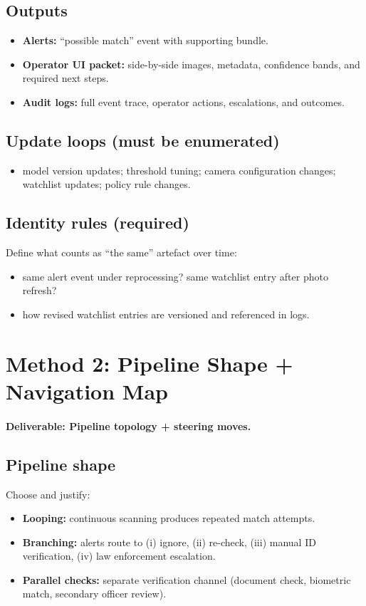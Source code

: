 \subsection*{Outputs}
\begin{itemize}
  \item \textbf{Alerts:} “possible match” event with supporting bundle.
  \item \textbf{Operator UI packet:} side-by-side images, metadata, confidence bands, and required next steps.
  \item \textbf{Audit logs:} full event trace, operator actions, escalations, and outcomes.
\end{itemize}

\subsection*{Update loops (must be enumerated)}
\begin{itemize}
  \item model version updates; threshold tuning; camera configuration changes; watchlist updates; policy rule changes.
\end{itemize}

\subsection*{Identity rules (required)}
Define what counts as “the same” artefact over time:
\begin{itemize}
  \item same alert event under reprocessing? same watchlist entry after photo refresh?
  \item how revised watchlist entries are versioned and referenced in logs.
\end{itemize}

\section{Method 2: Pipeline Shape + Navigation Map}
\label{sec:airport-m2}

\paragraph{Deliverable: Pipeline topology + steering moves.}

\subsection*{Pipeline shape}
Choose and justify:
\begin{itemize}
  \item \textbf{Looping:} continuous scanning produces repeated match attempts.
  \item \textbf{Branching:} alerts route to (i) ignore, (ii) re-check, (iii) manual ID verification, (iv) law enforcement escalation.
  \item \textbf{Parallel checks:} separate verification channel (document check, biometric match, secondary officer review).
\end{itemize}

